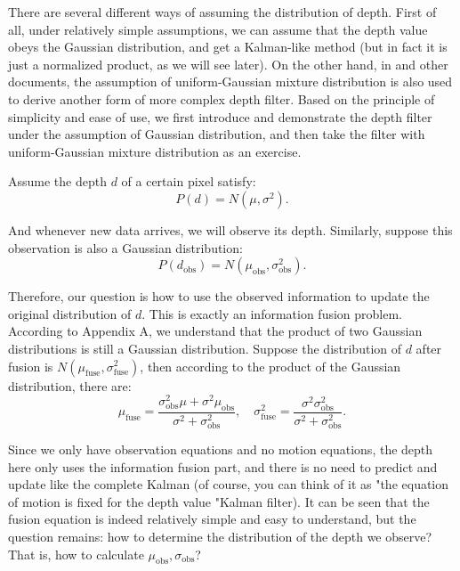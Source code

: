 There are several different ways of assuming the distribution of depth. First of all, under relatively simple assumptions, we can assume that the depth value obeys the Gaussian distribution, and get a Kalman-like method (but in fact it is just a normalized product, as we will see later). On the other hand, in \cite{Vogiatzis2011, Forster2014} and other documents, the assumption of uniform-Gaussian mixture distribution is also used to derive another form of more complex depth filter. Based on the principle of simplicity and ease of use, we first introduce and demonstrate the depth filter under the assumption of Gaussian distribution, and then take the filter with uniform-Gaussian mixture distribution as an exercise.

Assume the depth $d$ of a certain pixel satisfy:
\begin{equation}
	P(d) = N(\mu, \sigma^2).
\end{equation}

And whenever new data arrives, we will observe its depth. Similarly, suppose this observation is also a Gaussian distribution:
\begin{equation}
	P(d_{\mathrm{obs}}) = N(\mu_{\mathrm{obs}}, \sigma_{\mathrm{obs}}^2 ).
\end{equation}

Therefore, our question is how to use the observed information to update the original distribution of $d$. This is exactly an information fusion problem. According to Appendix A, we understand that the product of two Gaussian distributions is still a Gaussian distribution. Suppose the distribution of $d$ after fusion is $N(\mu_{\mathrm{fuse}}, \sigma_{\mathrm{fuse}}^2)$, then according to the product of the Gaussian distribution, there are:
\begin{equation}
	{\mu _{\mathrm{fuse}}} = \frac{{\sigma _{\mathrm{obs}}^2\mu  + {\sigma ^2}{\mu _{\mathrm{obs}}}}}{{{\sigma ^2} + \sigma _{\mathrm{obs}}^2}},\quad \sigma _{\mathrm{fuse}}^2 = \frac{{{\sigma ^2}\sigma _{\mathrm{obs}}^2}}{{{\sigma ^2} + \sigma _{\mathrm{obs}}^2}}.
\end{equation}

Since we only have observation equations and no motion equations, the depth here only uses the information fusion part, and there is no need to predict and update like the complete Kalman (of course, you can think of it as "the equation of motion is fixed for the depth value "Kalman filter). It can be seen that the fusion equation is indeed relatively simple and easy to understand, but the question remains: how to determine the distribution of the depth we observe? That is, how to calculate $\mu_{\mathrm{obs}}, \sigma_{\mathrm{obs}}$?

